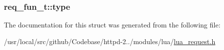\subsubsection[{\texorpdfstring{type}{type}}]{ req\+\_\+fun\+\_\+t\+::type}\hypertarget{structreq__fun__t_a5bdc94e9ebeba4e594cddf19b7f8da07}{}\label{structreq__fun__t_a5bdc94e9ebeba4e594cddf19b7f8da07}


The documentation for this struct was generated from the following file\+:\begin{DoxyCompactItemize}
\item 
/usr/local/src/github/\+Codebase/httpd-\/2../modules/lua/\hyperlink{lua__request_8h}{lua\+\_\+request.\+h}\end{DoxyCompactItemize}
